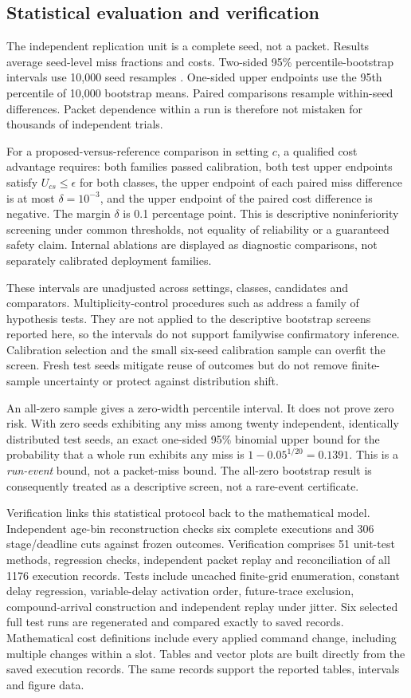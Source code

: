 \documentclass{IEEEoj}
\begin{document}
\subsection{Statistical evaluation and verification}
The independent replication unit is a complete seed, not a packet. Results
average seed-level miss fractions and costs. Two-sided 95\% percentile-bootstrap
intervals use 10,000 seed resamples \cite{efron}. One-sided upper endpoints
use the 95th percentile of 10,000 bootstrap means. Paired comparisons resample
within-seed differences. Packet dependence within a run is therefore not
mistaken for thousands of independent trials.

For a proposed-versus-reference comparison in setting $c$, a qualified cost
advantage requires: both families passed calibration, both test upper
endpoints satisfy $U_{cs}\le\epsilon$ for both classes, the upper endpoint
of each paired miss difference is at most $\delta=10^{-3}$, and the upper
endpoint of the paired cost difference is negative. The margin $\delta$ is
0.1 percentage point. This is descriptive noninferiority screening under
common thresholds, not equality of reliability or a guaranteed safety claim.
Internal ablations are displayed as diagnostic comparisons, not separately
calibrated deployment families.

These intervals are unadjusted across settings, classes, candidates and
comparators. Multiplicity-control procedures such as \cite{holm} address a family of hypothesis tests. They are not applied to the descriptive bootstrap screens reported here, so the intervals do not support familywise confirmatory inference. Calibration
selection and the small six-seed calibration sample can overfit the screen.
Fresh test seeds mitigate reuse of outcomes but do not remove finite-sample
uncertainty or protect against distribution shift.

An all-zero sample gives a zero-width percentile interval. It does not prove
zero risk. With zero seeds exhibiting any miss among twenty independent,
identically distributed test seeds, an exact one-sided 95\% binomial upper
bound for the probability that a whole run exhibits any miss is
$1-0.05^{1/20}=0.1391$. This is a \emph{run-event} bound, not a packet-miss
bound. The all-zero bootstrap result is consequently treated as a descriptive
screen, not a rare-event certificate.


Verification links this statistical protocol back to the mathematical
model. Independent age-bin reconstruction checks six complete executions and
306 stage/deadline cuts against frozen outcomes.
Verification comprises 51 unit-test methods, regression checks, independent packet replay and reconciliation of all 1176 execution records. Tests include uncached finite-grid enumeration, constant
delay regression, variable-delay activation order, future-trace exclusion,
compound-arrival construction and independent replay under jitter.
Six selected full test runs are regenerated and compared exactly to saved
records. Mathematical cost definitions include every applied command change,
including multiple changes within a slot. Tables and vector plots are built
directly from the saved execution records. The same records support the reported tables, intervals and figure data.
\end{document}
